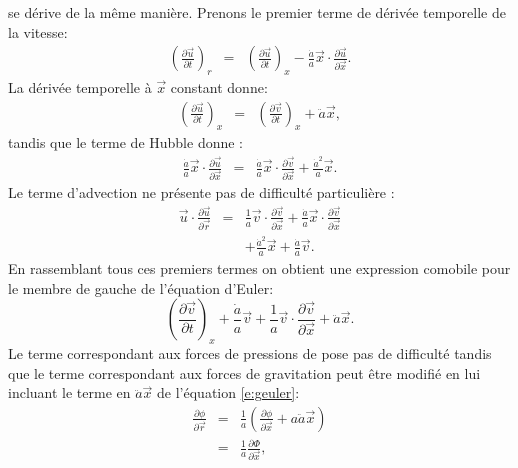   se dérive de la même manière. Prenons le premier terme de dérivée temporelle de la vitesse:
 \begin{eqnarray}
 \left(\frac{\partial \vec u}{\partial t}\right)_r&=&\left(\frac{\partial \vec u}{\partial t}\right)_x-\frac{\dot a }{a}\vec x \cdot \frac{\partial \vec u}{\partial \vec x}.
\end{eqnarray}  
La dérivée temporelle à $\vec x$ constant donne:
\begin{eqnarray}
\left(\frac{\partial \vec u}{\partial t}\right)_x&=&\left(\frac{\partial \vec v}{\partial t}\right)_x + \ddot a {\vec x},
\end{eqnarray}
tandis que le terme de Hubble donne :
\begin{eqnarray}
\frac{\dot a }{a}\vec x \cdot \frac{\partial \vec u}{\partial \vec x}&=&\frac{\dot a }{a}\vec x \cdot \frac{\partial \vec v}{\partial \vec x}+\frac{\dot a^2}{a}\vec x.
\end{eqnarray}
 Le terme d'advection ne présente pas de difficulté particulière  :
 \begin{eqnarray}
 \vec u \cdot \frac{\partial \vec u}{\partial \vec r}&=&\frac{1}{a}\vec v \cdot \frac{\partial \vec v}{\partial \vec x}+\frac{\dot a}{a}\vec x \cdot \frac{\partial \vec v}{\partial \vec x}\\
 &&+ \frac{\dot a^2}{a}\vec x +\frac{\dot a}{a}\vec v.
 \end{eqnarray}
 En rassemblant tous ces premiers termes on obtient une expression comobile pour le membre de gauche de l'équation d'Euler:
 \begin{equation}
 \left(\frac{\partial \vec v}{\partial t}\right)_x +\frac{\dot a}{a}\vec v+\frac{1}{a}\vec v \cdot \frac{\partial \vec v}{\partial \vec x} + \ddot a {\vec x}. 
 \label{e:geuler}
 \end{equation}
 Le terme correspondant aux forces de pressions de pose pas de difficulté tandis que le terme correspondant aux forces de gravitation peut être modifié en lui incluant le terme en $\ddot a {\vec x}$ de l'équation \ref{e:geuler}:
 \begin{eqnarray}
  \frac{\partial \phi}{\partial \vec r}&=&\frac{1}{a}(\frac{\partial \phi}{\partial \vec x}+a\ddot a \vec x)\\
  &=&\frac{1}{a}\frac{\partial \Phi}{\partial \vec x},
 \end{eqnarray}

